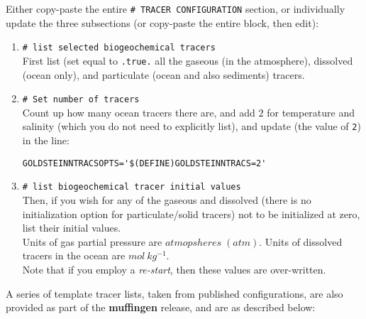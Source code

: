 \documentclass[11pt,fleqn]{book} %
\begin{document}
Either copy-paste the entire \texttt{\# TRACER\ CONFIGURATION} section, or individually update the three subsections (or copy-paste the entire block, then edit):

\begin{enumerate}[noitemsep]
\vspace{1mm}
\item \texttt{\# list selected biogeochemical tracers}
\\First list (set equal to \texttt{.true.} all the gaseous (in the atmosphere), dissolved (ocean only), and particulate (ocean and also sediments) tracers.
\vspace{1mm}
\item \texttt{\# Set number of tracers}
\\Count up how many ocean tracers there are, and add \(2\) for temperature and salinity (which you do not need to explicitly list), and update (the value of \texttt{2}) in the line:
\footnotesize\begin{verbatim}
GOLDSTEINNTRACSOPTS='$(DEFINE)GOLDSTEINNTRACS=2'
\end{verbatim}\normalsize
\vspace{1mm}
\item \texttt{\# list biogeochemical tracer initial values}
\\Then, if you wish for any of the gaseous and dissolved (there is no initialization option for particulate/solid tracers) not to be initialized at zero, list their initial values.
\\Units of gas partial pressure are \(atmopsheres \;(atm)\). Units of dissolved tracers in the ocean are \(mol\:kg^{-1}\).
\\Note that if you employ a \textit{re-start}, then these values are over-written.
\end{enumerate}
\vspace{1mm}

A series of template tracer lists, taken from published configurations, are also provided as part of the \textbf{muffingen} release, and are as described below:
\end{document}
